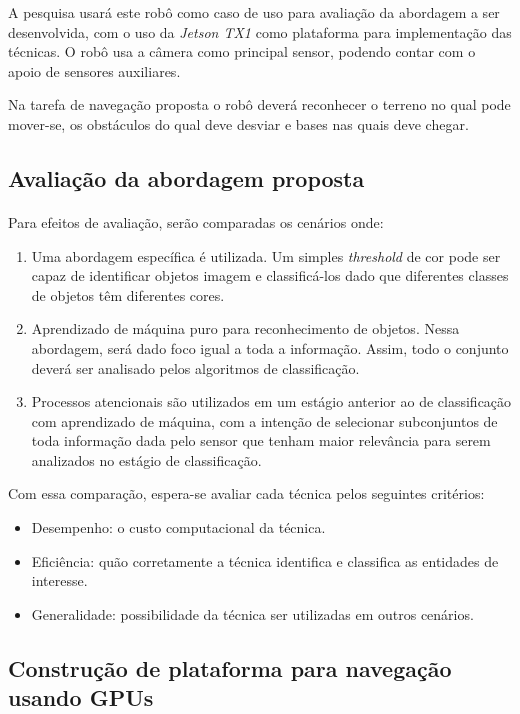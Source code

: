\documentclass[11pt]{article}
\newcommand{\tit}[1]{\textit{#1}}
\begin{document}
A pesquisa usará este robô como caso de uso para
avaliação da abordagem a ser desenvolvida, com o uso da \tit{Jetson TX1} 
como plataforma para implementação das técnicas.
O robô usa a câmera como principal sensor, podendo contar com o apoio de sensores auxiliares.

Na tarefa de navegação proposta o robô deverá reconhecer o terreno no qual pode mover-se, os obstáculos do
qual deve desviar e bases nas quais deve chegar.

\subsection{Avaliação da abordagem proposta}
\paragraph{}
Para efeitos de avaliação, serão comparadas os cenários onde: 
\begin{enumerate}
	\item Uma abordagem específica é utilizada.  
		Um simples \tit{threshold} de cor pode ser capaz de identificar objetos
		imagem e classificá-los dado que diferentes classes de objetos têm
		diferentes cores.
	\item Aprendizado de máquina puro para reconhecimento de objetos.
		Nessa abordagem, será dado foco igual a toda a informação. 
		Assim, todo o conjunto deverá ser analisado pelos algoritmos de classificação.
	\item Processos atencionais são utilizados em um estágio anterior ao de 
		classificação com aprendizado de máquina, com a intenção de selecionar
		subconjuntos de toda informação dada pelo sensor que tenham maior 
		relevância para serem analizados no estágio de classificação.
\end{enumerate}

Com essa comparação, espera-se avaliar cada técnica pelos seguintes critérios:
\begin{itemize}
	\item Desempenho: o custo computacional da técnica.
	\item Eficiência: quão corretamente a técnica identifica e classifica
		as entidades de interesse.
	\item Generalidade: possibilidade da técnica ser utilizadas em outros 
		cenários.
\end{itemize}

\subsection{Construção de plataforma para navegação usando GPUs}
\end{document}
